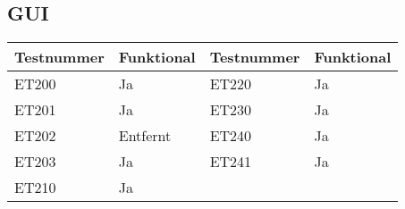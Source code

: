 \subsection{GUI}

\begin{tabularx}{0.9\textwidth}{p{}|p{}||p{}|p{}}
    \textbf{Testnummer} & \textbf{Funktional} & \textbf{Testnummer} & \textbf{Funktional}\\
    \hline
    ET200	& Ja		& ET220		& Ja\\
    \hline
    ET201	& Ja		& ET230		& Ja\\
    \hline
    ET202	& Entfernt		& ET240		& Ja\\
    \hline
    ET203	& Ja		& ET241		& Ja\\
    \hline
    ET210	& Ja		& 		& \\
\end{tabularx}